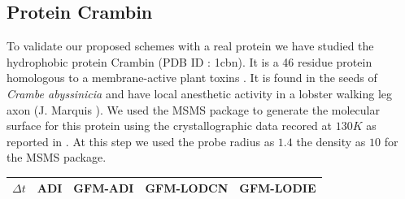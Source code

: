 \subsection{Protein Crambin } To validate our proposed schemes with a real protein we have studied the hydrophobic protein Crambin (PDB ID : 1cbn). It is a 46 residue protein homologous to a membrane-active plant toxins \cite{1cbn_paper}. It is found in the seeds of \textit{Crambe abyssinicia} and have local anesthetic activity in a lobster walking leg axon (J. Marquis \cite{1cbn_paper}). We used the MSMS package to generate the molecular surface for this protein using the crystallographic data recored at $130 K$ as reported in \cite{1cbn_paper}. At this step we used the probe radius as $1.4$ the density as $10$ for the MSMS package.
\begin{table}[!ht]
\centering
\begin{tabular}{c c c c c }
\hline
$\Delta t$  & ADI  & GFM-ADI       & GFM-LODCN     & GFM-LODIE     \\ \hline

\end{tabular}
\end{table}
